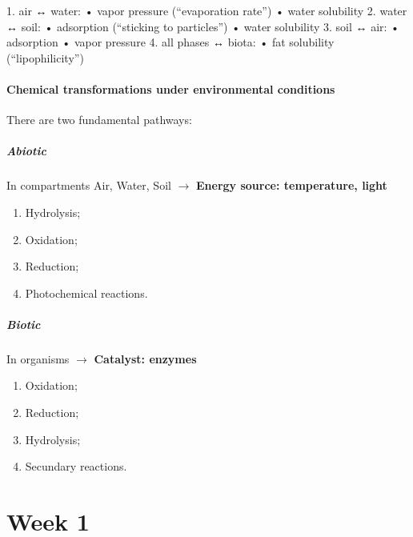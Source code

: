 \documentclass{article}
\begin{document}
1. air ↔ water:
• vapor pressure (“evaporation rate”)
• water solubility
2. water ↔ soil:
• adsorption (“sticking to particles”)
• water solubility
3. soil ↔ air:
• adsorption
• vapor pressure
4. all phases ↔ biota:
• fat solubility (“lipophilicity”)

\subsection{Chemical transformations under environmental conditions}
There are two fundamental pathways:

\subsubsection{Abiotic}
In compartments Air, Water, Soil $\rightarrow$ \textbf{Energy source: temperature, light}
\begin{enumerate}
    \item Hydrolysis;
    \item Oxidation;
    \item Reduction;
    \item Photochemical reactions.
\end{enumerate}

\subsubsection{Biotic}
In organisms $\rightarrow$ \textbf{Catalyst: enzymes}
\begin{enumerate}
    \item Oxidation;
    \item Reduction;
    \item Hydrolysis;
    \item Secundary reactions.
\end{enumerate}

\newpage
\part{Week 1}
\end{document}
